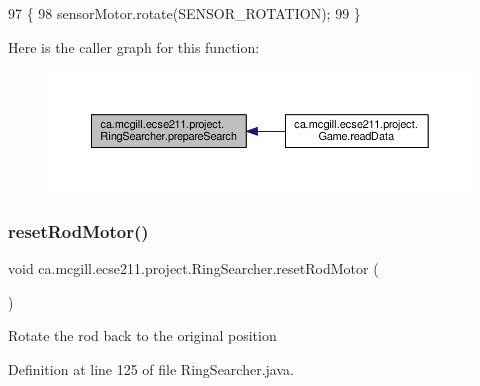 \begin{DoxyCode}
97                               \{
98     sensorMotor.rotate(SENSOR\_ROTATION);
99   \}
\end{DoxyCode}
Here is the caller graph for this function\+:\nopagebreak
\begin{figure}[H]
\begin{center}
\leavevmode
\includegraphics[width=350pt]{classca_1_1mcgill_1_1ecse211_1_1project_1_1_ring_searcher_abf31c36cadb144a4651b11f7fa37120a_icgraph}
\end{center}
\end{figure}
\mbox{\label{classca_1_1mcgill_1_1ecse211_1_1project_1_1_ring_searcher_a8b0ea0bf4cd07b6c8a090c3e9bc8eb04}} 
\subsubsection{\texorpdfstring{reset\+Rod\+Motor()}{resetRodMotor()}}
{\footnotesize\ttfamily void ca.\+mcgill.\+ecse211.\+project.\+Ring\+Searcher.\+reset\+Rod\+Motor (\begin{DoxyParamCaption}{ }\end{DoxyParamCaption})}

Rotate the rod back to the original position 

Definition at line 125 of file Ring\+Searcher.\+java.


